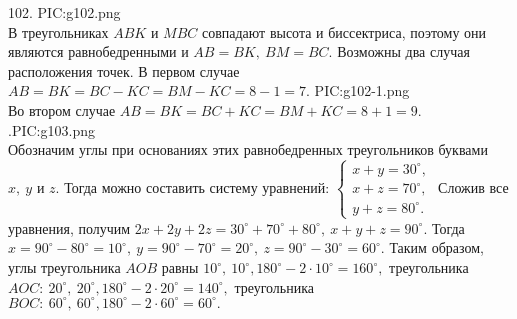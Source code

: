 102. {{PIC:g102.png}}\\
В треугольниках $ABK$ и $MBC$ совпадают высота и биссектриса, поэтому они являются равнобедренными и $AB=BK,\ BM=BC.$ Возможны два случая расположения точек. В первом случае $AB=BK=BC-KC=BM-KC=8-1=7.$
 {{PIC:g102-1.png}}\\
Во втором случае $AB=BK=BC+KC=BM+KC=8+1=9.$\newpage
{}.{{PIC:g103.png}}\\
Обозначим углы при основаниях этих равнобедренных треугольников буквами $x,\ y$ и $z.$ Тогда можно составить систему уравнений: $\begin{cases}x+y=30^\circ,\\
x+z=70^\circ,\\ y+z=80^\circ.\end{cases}$ Сложив все уравнения, получим $2x+2y+2z=30^\circ+70^\circ+80^\circ,\ x+y+z=90^\circ.$ Тогда $x=90^\circ-80^\circ=10^\circ,\ y=90^\circ-70^\circ=20^\circ,\ z=90^\circ-30^\circ=60^\circ.$ Таким образом, углы треугольника $AOB$ равны $10^\circ,\ 10^\circ, 180^\circ-2\cdot10^\circ=160^\circ,$ треугольника $AOC:\ 20^\circ,\ 20^\circ, 180^\circ-2\cdot20^\circ=140^\circ,$ треугольника $BOC:\ 60^\circ,\ 60^\circ, 180^\circ-2\cdot60^\circ=60^\circ.$\\
